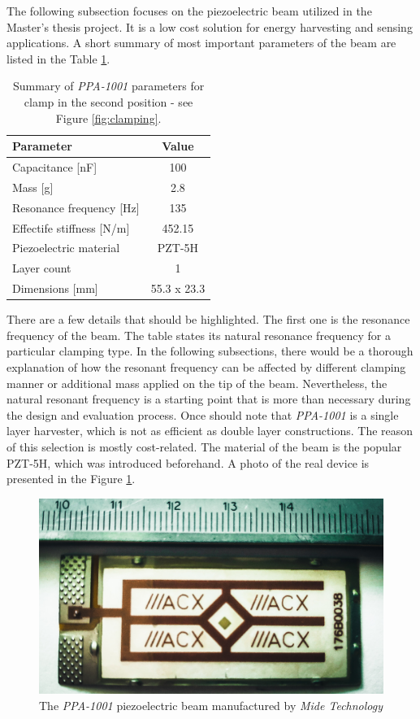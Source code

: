 \documentclass[12pt,a4paper]{article}
\begin{document}
The following subsection focuses on the piezoelectric beam utilized in the Master's thesis project. It is a low cost solution for energy harvesting and sensing applications. A short summary of most important parameters of the beam are listed in the Table \ref{tab:ppaparams}.

\begin{table}[ht!]
\begin{tabular}{|l|c|}
\hline
\textbf{Parameter}              & \textbf{Value} \\ \hline
Capacitance [nF] & 100         \\ \hline
Mass [g]                 & 2.8        \\ \hline
Resonance frequency [Hz]               & 135 \\ \hline
Effectife stiffness [N/m]     & 452.15           \\ \hline
Piezoelectric material                    & PZT-5H \\ \hline
Layer count                   & 1 \\ \hline
Dimensions [mm]                  & 55.3 x 23.3 \\ \hline
\end{tabular}
\caption{Summary of \textit{PPA-1001} parameters \cite{PPA} for clamp in the second position - see Figure \ref{fig:clamping}.}
\label{tab:ppaparams}
\end{table}

There are a few details that should be highlighted. The first one is the resonance frequency of the beam. The table states its natural resonance frequency for a particular clamping type. In the following subsections, there would be a thorough explanation of how the resonant frequency can be affected by different clamping manner or additional mass applied on the tip of the beam. Nevertheless, the natural resonant frequency is a starting point that is more than necessary during the design and evaluation process. Once should note that \textit{PPA-1001} is a single layer harvester, which is not as efficient as double layer constructions. The reason of this selection is mostly cost-related. The material of the beam is the popular PZT-5H, which was introduced beforehand. A photo of the real device is presented in the Figure \ref{fig:ppa}.

\begin{figure}[ht!]
\includegraphics[scale=0.1]{ppa.jpg}
\caption{The \textit{PPA-1001} piezoelectric beam manufactured by \textit{Mide Technology}}
\label{fig:ppa}
\end{figure}
\end{document}
